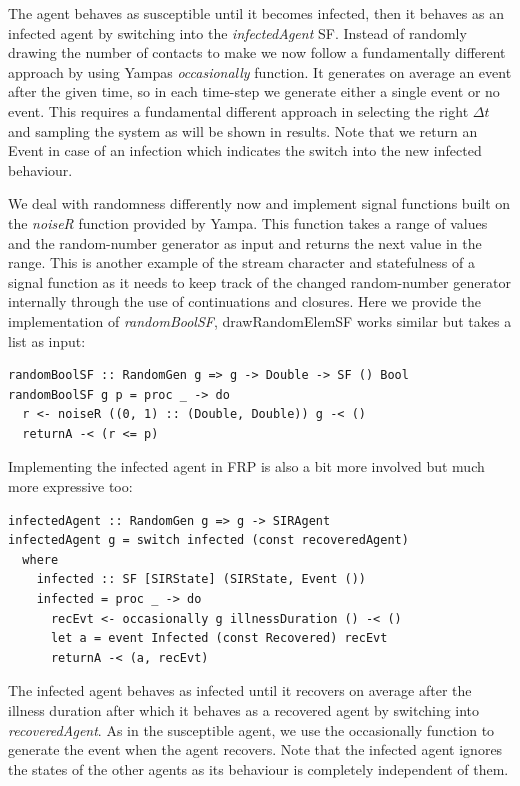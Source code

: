 The agent behaves as susceptible until it becomes infected, then it behaves as an infected agent by switching into the \textit{infectedAgent} SF. Instead of randomly drawing the number of contacts to make we now follow a fundamentally different approach by using Yampas \textit{occasionally} function. It generates on average an event after the given time, so in each time-step we generate either a single event or no event. This requires a fundamental different approach in selecting the right $\Delta t$ and sampling the system as will be shown in results. Note that we return an Event in case of an infection which indicates the switch into the new infected behaviour.

We deal with randomness differently now and implement signal functions built on the \textit{noiseR} function provided by Yampa. This function takes a range of values and the random-number generator as input and returns the next value in the range. This is another example of the stream character and statefulness of a signal function as it needs to keep track of the changed random-number generator internally through the use of continuations and closures. Here we provide the implementation of \textit{randomBoolSF}, drawRandomElemSF works similar but takes a list as input:

\begin{verbatim}
randomBoolSF :: RandomGen g => g -> Double -> SF () Bool
randomBoolSF g p = proc _ -> do
  r <- noiseR ((0, 1) :: (Double, Double)) g -< ()
  returnA -< (r <= p)
\end{verbatim}

Implementing the infected agent in FRP is also a bit more involved but much more expressive too:

\begin{verbatim}
infectedAgent :: RandomGen g => g -> SIRAgent
infectedAgent g = switch infected (const recoveredAgent)
  where
    infected :: SF [SIRState] (SIRState, Event ())
    infected = proc _ -> do
      recEvt <- occasionally g illnessDuration () -< ()
      let a = event Infected (const Recovered) recEvt
      returnA -< (a, recEvt)
\end{verbatim}

The infected agent behaves as infected until it recovers on average after the illness duration after which it behaves as a recovered agent by switching into \textit{recoveredAgent}. As in the susceptible agent, we use the occasionally function to generate the event when the agent recovers. Note that the infected agent ignores the states of the other agents as its behaviour is completely independent of them.

